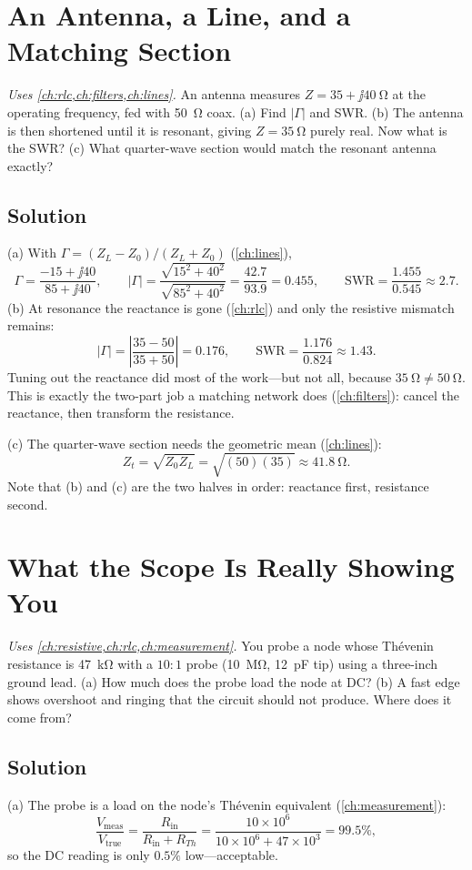 \section{An Antenna, a Line, and a Matching Section}
\emph{Uses \cref{ch:rlc,ch:filters,ch:lines}.} An antenna measures
\(Z=35+\jj40\ \si{\ohm}\) at the operating frequency, fed with \SI{50}{\ohm} coax.
(a) Find \(|\Gamma|\) and SWR. (b) The antenna is then shortened until it is resonant,
giving \(Z=\SI{35}{\ohm}\) purely real. Now what is the SWR? (c) What quarter-wave
section would match the resonant antenna exactly?

\subsection*{Solution}
(a) With \(\Gamma=(Z_L-Z_0)/(Z_L+Z_0)\) (\cref{ch:lines}),
\[
\Gamma=\frac{-15+\jj40}{85+\jj40},
\qquad
|\Gamma|=\frac{\sqrt{15^2+40^2}}{\sqrt{85^2+40^2}}=\frac{42.7}{93.9}=0.455,
\qquad
\mathrm{SWR}=\frac{1.455}{0.545}\approx2.7 .
\]
(b) At resonance the reactance is gone (\cref{ch:rlc}) and only the resistive
mismatch remains:
\[
|\Gamma|=\left|\frac{35-50}{35+50}\right|=0.176,
\qquad
\mathrm{SWR}=\frac{1.176}{0.824}\approx1.43 .
\]
Tuning out the reactance did most of the work---but not all, because
\(\SI{35}{\ohm}\ne\SI{50}{\ohm}\). This is exactly the two-part job a matching network
does (\cref{ch:filters}): cancel the reactance, then transform the resistance.

(c) The quarter-wave section needs the geometric mean (\cref{ch:lines}):
\[
Z_t=\sqrt{Z_0Z_L}=\sqrt{(50)(35)}\approx\SI{41.8}{\ohm}.
\]
Note that (b) and (c) are the two halves in order: reactance first, resistance second.

\section{What the Scope Is Really Showing You}
\emph{Uses \cref{ch:resistive,ch:rlc,ch:measurement}.} You probe a node whose
Th\'evenin resistance is \SI{47}{\kilo\ohm} with a \(10\!:\!1\) probe
(\SI{10}{\mega\ohm}, \SI{12}{\pico\farad} tip) using a three-inch ground lead.
(a) How much does the probe load the node at DC? (b) A fast edge shows overshoot and
ringing that the circuit should not produce. Where does it come from?

\subsection*{Solution}
(a) The probe is a load on the node's Th\'evenin equivalent
(\cref{ch:measurement}):
\[
\frac{V_{\text{meas}}}{V_{\text{true}}}=\frac{R_{\mathrm{in}}}{R_{\mathrm{in}}+R_{Th}}
=\frac{10\times10^6}{10\times10^6+47\times10^3}=99.5\%,
\]
so the DC reading is only \(0.5\%\) low---acceptable.

